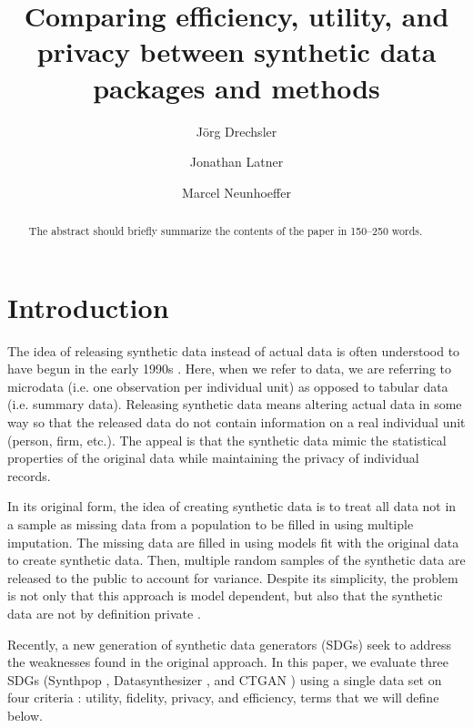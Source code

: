 \documentclass[runningheads]{llncs}
\title{Comparing efficiency, utility, and privacy between synthetic data packages and methods}
\author{Jörg Drechsler\inst{1 (\text{\Letter})} \and
Jonathan Latner\inst{1 \orcidlink{0000-0002-1825-0097}} \and
Marcel Neunhoeffer\inst{1 \orcidlink{0000-0002-9137-5785}}}
\institute{Institute for Employment Research, Nuremberg, Germany
\email{{joerg.drechsler,jonathan.latner,marcel.neunhoeffer}@iab.de}}
\begin{document}
\maketitle              %
%
\begin{abstract}
The abstract should briefly summarize the contents of the paper in
150--250 words.

\end{abstract}


\clearpage

\section{Introduction}

The idea of releasing synthetic data instead of actual data is often understood to have begun in the early 1990s \cite{rubin1993statistical,little1993statistical}.  Here, when we refer to data, we are referring to microdata (i.e. one observation per individual unit) as opposed to tabular data (i.e. summary data).  Releasing synthetic data means altering actual data in some way so that the released data do not contain information on a real individual unit (person, firm, etc.).  The appeal is that the synthetic data mimic the statistical properties of the original data while maintaining the privacy of individual records.

In its original form, the idea of creating synthetic data is to treat all data not in a sample as missing data from a population to be filled in using multiple imputation.  The missing data are filled in using models fit with the original data to create synthetic data.  Then, multiple random samples of the synthetic data are released to the public to account for variance.  Despite its simplicity, the problem is not only that this approach is model dependent, but also that the synthetic data are not by definition private \cite{reiter2009estimating}.  

Recently, a new generation of synthetic data generators (SDGs) seek to address the weaknesses found in the original approach.  In this paper, we evaluate three SDGs (Synthpop \cite{nowok2016synthpop}, Datasynthesizer \cite{ping2017datasynthesizer}, and CTGAN \cite{patki2016synthetic}) using a single data set on four criteria \cite{jordon2022synthetic}: utility, fidelity, privacy, and efficiency, terms that we will define below.  
\end{document}
